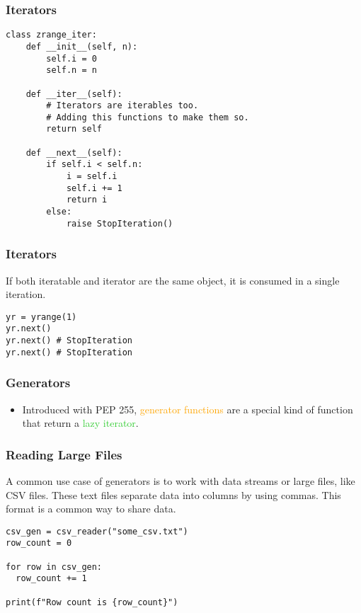 \documentclass{../py-lecture}
\begin{document}
\begin{frame}[fragile]
	\frametitle{Iterators}
  \begin{verbatim}
class zrange_iter:
    def __init__(self, n):
        self.i = 0
        self.n = n

    def __iter__(self):
        # Iterators are iterables too.
        # Adding this functions to make them so.
        return self

    def __next__(self):
        if self.i < self.n:
            i = self.i
            self.i += 1
            return i
        else:
            raise StopIteration()
	\end{verbatim}
\end{frame}

\begin{frame}[fragile]
	\frametitle{Iterators}
  \begin{block}{}
		If both iteratable and iterator are the same object, it is consumed in a single iteration.
	\end{block}
  \begin{verbatim}
yr = yrange(1)
yr.next()
yr.next() # StopIteration
yr.next() # StopIteration
	\end{verbatim}
\end{frame}

\begin{frame}
  \frametitle{Generators}
  \begin{itemize}
    \item Introduced with PEP 255, \textcolor{Orange}{generator functions} are a special kind of function that return a \textcolor{LimeGreen}{lazy iterator}.
  \end{itemize}
\end{frame}

\begin{frame}[fragile]
  \frametitle{Reading Large Files}
  \begin{block}{}
    A common use case of generators is to work with data streams or large files, like CSV files.
    These text files separate data into columns by using commas. This format is a common way to share data.
  \end{block}
  \begin{verbatim}
csv_gen = csv_reader("some_csv.txt")
row_count = 0

for row in csv_gen:
  row_count += 1

print(f"Row count is {row_count}")
  \end{verbatim}
\end{frame}
\end{document}
